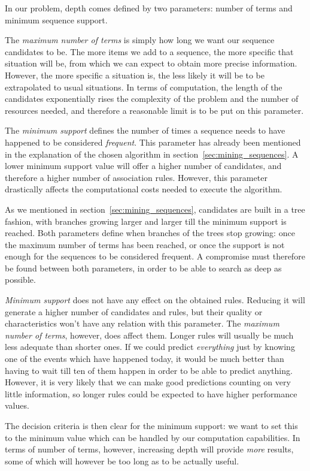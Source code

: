 In our problem, depth comes defined by two parameters: number of terms and minimum sequence support.

The \emph{maximum number of terms} is simply how long we want our sequence candidates to be. The more items we add to a sequence, the more specific that situation will be, from which we can expect to obtain more precise information. However, the more specific a situation is, the less likely it will be to be extrapolated to usual situations. In terms of computation, the length of the candidates exponentially rises the complexity of the problem and the number of resources needed, and therefore a reasonable limit is to be put on this parameter.

The \emph{minimum support} defines the number of times a sequence needs to have happened to be considered \emph{frequent}. This parameter has already been mentioned in the explanation of the chosen algorithm in section~\ref{sec:mining_sequences}. A lower minimum support value will offer a higher number of candidates, and therefore a higher number of association rules. However, this parameter drastically affects the computational costs needed to execute the algorithm.

As we mentioned in section~\ref{sec:mining_sequences}, candidates are built in a tree fashion, with branches growing larger and larger till the minimum support is reached. Both parameters define when branches of the trees stop growing: once the maximum number of terms has been reached, or once the support is not enough for the sequences to be considered frequent. A compromise must therefore be found between both parameters, in order to be able to search as deep as possible.

\emph{Minimum support} does not have any effect on the obtained rules. Reducing it will generate a higher number of candidates and rules, but their quality or characteristics won't have any relation with this parameter. The \emph{maximum number of terms}, however, does affect them. Longer rules will usually be much less adequate than shorter ones. If we could predict \emph{everything} just by knowing one of the events which have happened today, it would be much better than having to wait till ten of them happen in order to be able to predict anything. However, it is very likely that we can make good predictions counting on very little information, so longer rules could be expected to have higher performance values.

The decision criteria is then clear for the minimum support: we want to set this to the minimum value which can be handled by our computation capabilities. In terms of number of terms, however, increasing depth will provide \emph{more} results, some of which will however be too long as to be actually useful.


